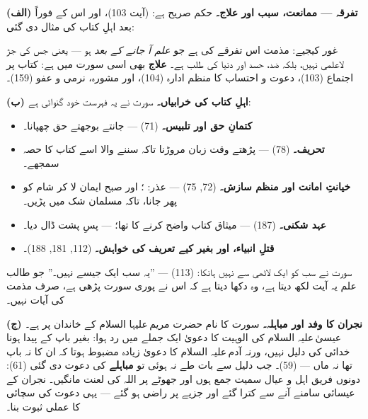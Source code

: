 \begin{hal}
\textbf{(الف) تفرقہ --- ممانعت، سبب اور علاج۔} حکم صریح ہے:  (آیت \textenglish{103})، اور اس کے
فوراً بعد اہلِ کتاب کی مثال دی گئی:


\smallskip
غور کیجیے: مذمت اس تفرقے کی ہے جو \emph{علم آ جانے کے بعد} ہو --- یعنی جس کی
جڑ لاعلمی نہیں، بلکہ ضد، حسد اور دنیا کی طلب ہے۔ \textbf{علاج} بھی اسی سورت
میں ہے: کتاب پر اجتماع (\textenglish{103})، دعوت و احتساب کا منظم ادارہ
(\textenglish{104})، اور مشورہ، نرمی و عفو (\textenglish{159})۔

\medskip
\textbf{(ب) اہلِ کتاب کی خرابیاں۔} سورت نے یہ فہرست خود گنوائی ہے:

\begin{itemize}\setlength{\itemsep}{1pt}
  \item \textbf{کتمانِ حق اور تلبیس۔}  (\textenglish{71}) --- جانتے
        بوجھتے حق چھپانا۔
  \item \textbf{تحریف۔} 
        (\textenglish{78}) --- پڑھتے وقت زبان مروڑنا تاکہ سننے والا اسے کتاب
        کا حصہ سمجھے۔
  \item \textbf{خیانتِ امانت اور منظم سازش۔} (\textenglish{72, 75}) ---
        عذر: ؛ اور صبح ایمان
        لا کر شام کو پھر جانا، تاکہ مسلمان شک میں پڑیں۔
  \item \textbf{عہد شکنی۔} (\textenglish{187}) --- میثاق کتاب واضح کرنے کا
        تھا؛  --- پسِ پشت ڈال دیا۔
  \item \textbf{قتلِ انبیاء، اور بغیر کیے تعریف کی خواہش۔}
        (\textenglish{112, 181, 188})۔
\end{itemize}

\begin{nukta}
سورت نے سب کو ایک لاٹھی سے نہیں ہانکا: 
(\textenglish{113}) --- ''یہ سب ایک جیسے نہیں۔'' جو طالب علم یہ آیت لکھ دیتا
ہے، وہ دکھا دیتا ہے کہ اس نے پوری سورت پڑھی ہے، صرف مذمت کی آیات نہیں۔
\end{nukta}

\medskip
\textbf{(ج) نجران کا وفد اور مباہلہ۔} سورت کا نام حضرت مریم\,علیہا السلام کے
خاندان پر ہے۔ عیسیٰ\,علیہ السلام کی الوہیت کا دعویٰ ایک جملے میں رد ہوا: بغیر
باپ کے پیدا ہونا خدائی کی دلیل نہیں، ورنہ آدم\,علیہ السلام کا دعویٰ زیادہ
مضبوط ہوتا کہ ان کا نہ باپ تھا نہ ماں ---  (\textenglish{59})۔ جب دلیل سے بات طے نہ
ہوئی تو \textbf{مباہلے} کی دعوت دی گئی (\textenglish{61}): دونوں فریق اہل و
عیال سمیت جمع ہوں اور جھوٹے پر اللہ کی لعنت مانگیں۔ نجران کے عیسائی سامنے آنے
سے کترا گئے اور جزیے پر راضی ہو گئے --- یہی دعوت کی سچائی کا عملی ثبوت بنا۔
\end{hal}


